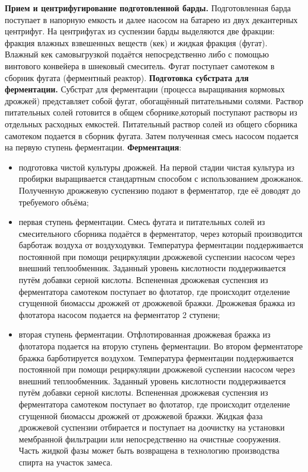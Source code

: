 \textbf{Прием и центрифугирование подготовленной барды.} Подготовленная барда поступает в напорную емкость и далее насосом на батарею из двух декантерных центрифуг. 
На центрифугах из суспензии барды выделяются две фракции: фракция влажных взвешенных веществ (кек) и жидкая фракция (фугат). 
Влажный кек самовыгрузкой подаётся непосредственно либо с помощью винтового конвейера в шнековый смеситель. Фугат поступает самотеком в сборник фугата (ферментный реактор). 
\textbf{Подготовка субстрата для ферментации.} 
Субстрат для ферментации (процесса выращивания кормовых дрожжей) представляет собой фугат, обогащённый питательными солями. 
Раствор питательных солей готовится в общем сборнике,который поступают растворы из отдельных расходных емкостей. 
Питательный раствор солей из общего сборника самотеком подается в сборник фугата. 
Затем полученная смесь насосом подается на первую ступень ферментации. 
\textbf{Ферментация}: 

\begin{itemize} 
\item подготовка чистой культуры дрожжей. На первой стадии чистая культура из пробирки выращивается стандартным способом с использованием дрожжанок. Полученную дрожжевую суспензию подают в ферментатор, где её доводят до требуемого объёма; 
\item первая ступень ферментации. 
Смесь фугата и питательных солей из смесительного сборника подаётся в ферментатор, через который производится барботаж воздуха от воздуходувки. 
Температура ферментации поддерживается постоянной при помощи рециркуляции дрожжевой суспензии насосом через внешний теплообменник. 
Заданный уровень кислотности поддерживается путём добавки серной кислоты. 
Вспененная дрожжевая суспензия из ферментатора самотеком поступает во флотатор, где происходит отделение сгущенной биомассы дрожжей от дрожжевой бражки. 
Дрожжевая бражка из флотатора насосом подается на ферментатор 2 ступени; 
\item вторая ступень ферментации. Отфлотированная дрожжевая бражка из флотатора подается на вторую ступень ферментации. 
Во втором ферментаторе бражка барботируется воздухом. 
Температура ферментации поддерживается постоянной при помощи рециркуляции дрожжевой суспензии насосом через внешний теплообменник. 
Заданный уровень кислотности поддерживается путём добавки серной кислоты. 
Вспененная дрожжевая суспензия из ферментатора самотеком поступает во флотатор, где происходит отделение сгущенной биомассы дрожжей от дрожжевой бражки. 
Жидкая фаза дрожжевой суспензии отбирается и поступает на доочистку на установки мембранной фильтрации или непосредственно на очистные сооружения. 
Часть жидкой фазы может быть возвращена в технологию производства спирта на участок замеса. 
\end{itemize} 

